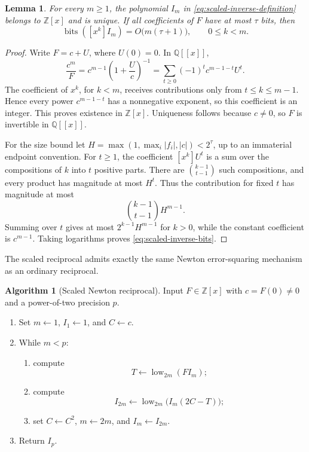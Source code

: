 \documentclass[11pt]{book}
\newtheorem{lemma}[theorem]{Lemma}
\theoremstyle{definition}
\newtheorem{algorithm}[theorem]{Algorithm}
\newcommand{\ZZ}{\mathbb Z}
\newcommand{\bits}{\operatorname{bits}}
\begin{document}
\begin{lemma}\label{lem:scaled-inverse-integral}
For every $m\ge1$, the polynomial $I_m$ in
\eqref{eq:scaled-inverse-definition} belongs to $\ZZ[x]$ and is unique.  If
all coefficients of $F$ have at most $\tau$ bits, then
\begin{equation}\label{eq:scaled-inverse-bits}
 \bits([x^k]I_m)=O\bigl(m(\tau+1)\bigr),
 \qquad 0\le k<m.
\end{equation}
\end{lemma}

\begin{proof}
Write $F=c+U$, where $U(0)=0$.  In $\mathbb Q[[x]]$,
\[
 \frac{c^m}{F}
 =c^{m-1}\left(1+\frac{U}{c}\right)^{-1}
 =\sum_{t\ge0}(-1)^t c^{m-1-t}U^t.
\]
The coefficient of $x^k$, for $k<m$, receives contributions only from
$t\le k\le m-1$.  Hence every power $c^{m-1-t}$ has a nonnegative exponent,
so this coefficient is an integer.  This proves existence in $\ZZ[x]$.
Uniqueness follows because $c\ne0$, so $F$ is invertible in
$\mathbb Q[[x]]$.

For the size bound let
$H=\max(1,\max_i|f_i|,|c|)<2^{\tau}$, up to an immaterial endpoint
convention.  For $t\ge1$, the coefficient $[x^k]U^t$ is a sum over the
compositions of $k$ into $t$ positive parts.  There are
$\binom{k-1}{t-1}$ such compositions, and every product has magnitude at most
$H^t$.  Thus the contribution for fixed $t$ has magnitude at most
\[
 \binom{k-1}{t-1}H^{m-1}.
\]
Summing over $t$ gives at most $2^{k-1}H^{m-1}$ for $k>0$, while the constant
coefficient is $c^{m-1}$.  Taking logarithms proves
\eqref{eq:scaled-inverse-bits}.
\end{proof}

The scaled reciprocal admits exactly the same Newton error-squaring mechanism
as an ordinary reciprocal.

\begin{algorithm}[Scaled Newton reciprocal]\label{alg:scaled-newton-inverse}
Input $F\in\ZZ[x]$ with $c=F(0)\ne0$ and a power-of-two precision $p$.
\begin{enumerate}
 \item Set $m\leftarrow1$, $I_1\leftarrow1$, and $C\leftarrow c$.
 \item While $m<p$:
 \begin{enumerate}
  \item compute
  \[
   T\leftarrow\operatorname{low}_{2m}(FI_m);
  \]
  \item compute
  \[
   I_{2m}\leftarrow
   \operatorname{low}_{2m}\bigl(I_m(2C-T)\bigr);
  \]
  \item set $C\leftarrow C^2$, $m\leftarrow2m$, and
  $I_m\leftarrow I_{2m}$.
 \end{enumerate}
 \item Return $I_p$.
\end{enumerate}
\end{algorithm}
\end{document}
